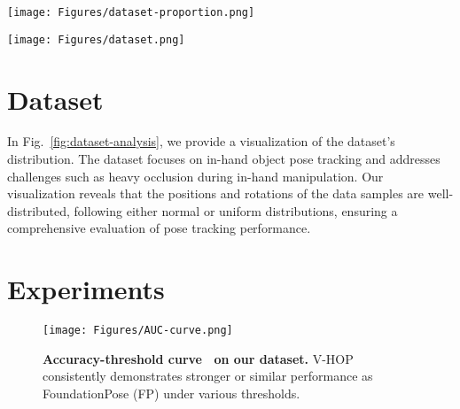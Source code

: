 \onecolumn
\appendices

\begin{figure*}[t!]
    \centering
    \texttt{[image: Figures/dataset-proportion.png]}
    \caption{
    \textbf{Distributions of embodiments and objects.}
    The novel gripper and object have fewer samples as they are only used for evaluation and not during training.
    }
    \label{fig:dataset-proportion}
\end{figure*}

\begin{figure*}
    \centering
    \texttt{[image: Figures/dataset.png]}
    \caption{
    \textbf{Dataset distributions}.
    We view the occlusion rate, position, and rotation distribution of our data samples.
    }
    \label{fig:dataset-analysis}
\end{figure*}

\section{Dataset}
In Fig.~\ref{fig:dataset-analysis}, we provide a visualization of the dataset's distribution. 
The dataset focuses on in-hand object pose tracking and addresses challenges such as heavy occlusion during in-hand manipulation. 
Our visualization reveals that the positions and rotations of the data samples are well-distributed, following either normal or uniform distributions, ensuring a comprehensive evaluation of pose tracking performance.


\section{Experiments}

\begin{figure}
    \centering
    \texttt{[image: Figures/AUC-curve.png]}
    \caption{
    \textbf{Accuracy-threshold curve~\cite{xiang_posecnn_2018} on our dataset.}
    V-HOP consistently demonstrates stronger or similar performance as FoundationPose (FP) under various thresholds.
    }
    \label{fig:enter-label}
\end{figure}

